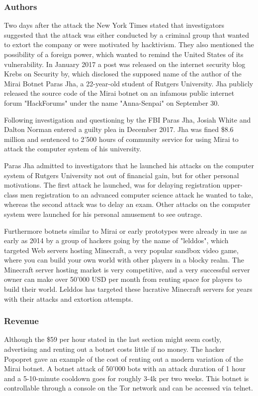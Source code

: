 \subsubsection{Authors}
		Two days after the attack the New York Times stated that investigators suggested that the attack was either conducted by a criminal group that wanted to extort the company or were motivated by hacktivism. They also mentioned the possibility of a foreign power, which wanted to remind the United States of its vulnerability.
In January 2017 a post was released on the internet security blog Krebs on Security by, which disclosed the supposed name of the author of the Mirai Botnet Paras Jha, a 22-year-old student of Rutgers University. Jha publicly released the source code of the Mirai botnet on an infamous public internet forum "HackForums" under the name "Anna-Senpai" on September 30. 

Following investigation and questioning by the FBI Paras Jha, Josiah White and Dalton Norman entered a guilty plea in December 2017. Jha was fined \$8.6 million and sentenced to 2'500 hours of community service for using Mirai to attack the computer system of his university.

Paras Jha admitted to investigators that he launched his attacks on the computer system of Rutgers University not out of financial gain, but for other personal motivations. The first attack he launched, was for delaying registration upper-class men registration to an advanced computer science attack he wanted to take, whereas the second attack was to delay an exam. Other attacks on the computer system were launched for his personal amusement to see outrage.

Furthermore botnets similar to Mirai or early prototypes were already in use as early as 2014 by a group of hackers going by the name of "lelddos", which targeted Web servers hosting Minecraft, a very popular sandbox video game, where you can build your own world with other players in a blocky realm. The Minecraft server hosting market is very competitive, and a very successful server owner can make over 50'000 USD per month from renting space for players to build their world. Lelddos has targeted these lucrative Minecraft servers for years with their attacks and extortion attempts. 

	\subsubsection{Revenue}
	Although the \$59 per hour stated in the last section might seem costly, advertising and renting out a botnet costs little if no money. The hacker Popopret gave an example of the cost of renting out a modern variation of the Mirai botnet. A botnet attack of 50'000 bots with an attack duration of 1 hour and a 5-10-minute cooldown goes for roughly 3-4k per two weeks. This botnet is controllable through a console on the Tor network and can be accessed via telnet.
	
